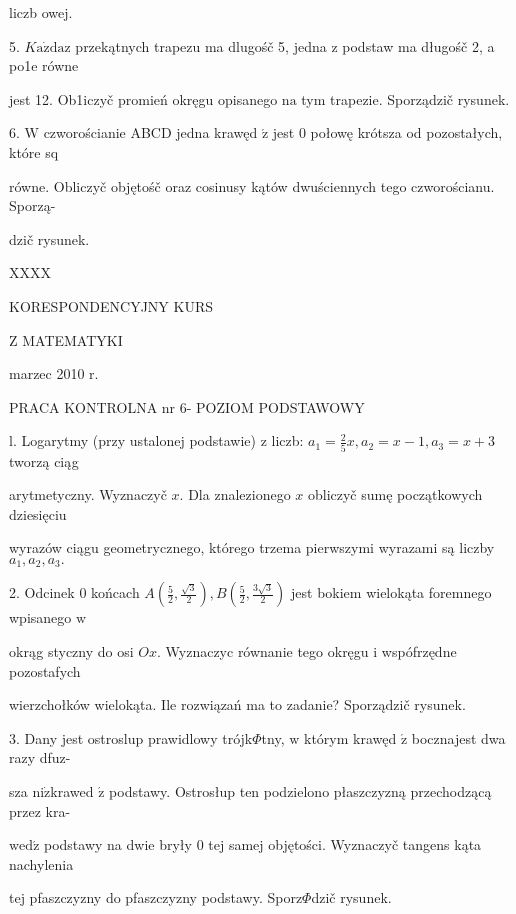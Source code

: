 \documentclass[a4paper,12pt]{article}
\begin{document}
liczb owej.

5. $K\mathrm{a}\dot{\mathrm{z}}\mathrm{d}\mathrm{a}\mathrm{z}$ przekątnych trapezu ma dlugośč 5, jedna $\mathrm{z}$ podstaw ma długośč 2, a po1e równe

jest 12. Ob1iczyč promień okręgu opisanego $\mathrm{n}\mathrm{a}$ tym trapezie. Sporządzič rysunek.

6. $\mathrm{W}$ czworościanie ABCD jedna krawęd $\acute{\mathrm{z}}$ jest $0$ połowę krótsza od pozostałych, które sq

równe. Obliczyč objętośč oraz cosinusy kątów dwuściennych tego czworościanu. Sporzą-

dzič rysunek.





XXXX

KORESPONDENCYJNY KURS

Z MATEMATYKI

marzec 2010 r.

PRACA KONTROLNA nr 6- POZIOM PODSTAWOWY

l. Logarytmy (przy ustalonej podstawie) $\mathrm{z}$ liczb: $a_{1}=\displaystyle \frac{2}{5}x, a_{2}=x-1, a_{3}=x+3$ tworzą ciąg

arytmetyczny. Wyznaczyč $x$. Dla znalezionego $x$ obliczyč sumę początkowych dziesięciu

wyrazów ciągu geometrycznego, którego trzema pierwszymi wyrazami są liczby $a_{1}, a_{2}, a_{3}.$

2. Odcinek $0$ końcach $A(\displaystyle \frac{5}{2},\frac{\sqrt{3}}{2}), B(\displaystyle \frac{5}{2},\frac{3\sqrt{3}}{2})$ jest bokiem wielokąta foremnego wpisanego $\mathrm{w}$

okrąg styczny do osi $Ox$. Wyznaczyc równanie tego okręgu $\mathrm{i}$ wspófrzędne pozostafych

wierzchołków wielokąta. Ile rozwiązań ma to zadanie? Sporządzič rysunek.

3. Dany jest ostroslup prawidlowy trójk$\Phi$tny, $\mathrm{w}$ którym krawęd $\acute{\mathrm{z}}$ bocznajest dwa razy dfuz-

sza $\mathrm{n}\mathrm{i}\dot{\mathrm{z}}$krawed $\acute{\mathrm{z}}$ podstawy. Ostrosłup ten podzielono płaszczyzną przechodzącą przez kra-

$\mathrm{w}\mathrm{e}\mathrm{d}\acute{\mathrm{z}}$ podstawy na dwie bryły $0$ tej samej objętości. Wyznaczyč tangens kąta nachylenia

tej pfaszczyzny do pfaszczyzny podstawy. Sporz$\Phi$dzič rysunek.
\end{document}
